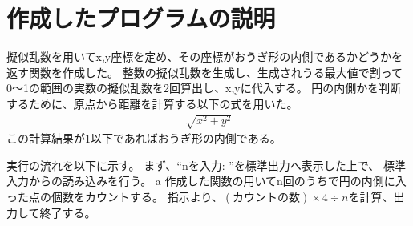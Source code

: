 

\section{作成したプログラムの説明}
擬似乱数を用いてx,y座標を定め、その座標がおうぎ形の内側であるかどうかを返す関数を作成した。
整数の擬似乱数を生成し、生成されうる最大値で割って0〜1の範囲の実数の擬似乱数を2回算出し、x,yに代入する。
円の内側かを判断するために、原点から距離を計算する以下の式を用いた。
\begin{align*}
  \sqrt{x^2 + y^2}
\end{align*}
この計算結果が1以下であればおうぎ形の内側である。

実行の流れを以下に示す。
まず、``nを入力: ''を標準出力へ表示した上で、
標準入力からの読み込みを行う。
a
作成した関数の用いてn回のうちで円の内側に入った点の個数をカウントする。
指示より、$(カウントの数) \times 4 \div n$を計算、出力して終了する。


